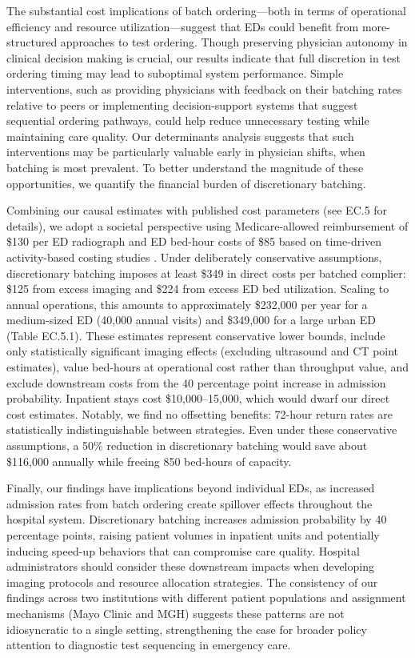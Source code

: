 \documentclass[,,blindrev]{informs}
\begin{document}
The substantial cost implications of batch ordering---both in terms of
operational efficiency and resource utilization---suggest that EDs could
benefit from more-structured approaches to test ordering. Though
preserving physician autonomy in clinical decision making is crucial,
our results indicate that full discretion in test ordering timing may
lead to suboptimal system performance. Simple interventions, such as
providing physicians with feedback on their batching rates relative to
peers or implementing decision-support systems that suggest sequential
ordering pathways, could help reduce unnecessary testing while
maintaining care quality. Our determinants analysis suggests that such
interventions may be particularly valuable early in physician shifts,
when batching is most prevalent. To better understand the magnitude of
these opportunities, we quantify the financial burden of discretionary
batching.

Combining our causal estimates with published cost parameters (see EC.5
for details), we adopt a societal perspective using Medicare-allowed
reimbursement of \$130 per ED radiograph \citep{dabus2025practice} and
ED bed-hour costs of \$85 based on time-driven activity-based costing
studies \citep[\citet{canellas2024measurement}]{schreyer2017economics}.
Under deliberately conservative assumptions, discretionary batching
imposes at least \$349 in direct costs per batched complier: \$125 from
excess imaging and \$224 from excess ED bed utilization. Scaling to
annual operations, this amounts to approximately \$232,000 per year for
a medium-sized ED (40,000 annual visits) and \$349,000 for a large urban
ED (Table EC.5.1). These estimates represent conservative lower bounds,
include only statistically significant imaging effects (excluding
ultrasound and CT point estimates), value bed-hours at operational cost
rather than throughput value, and exclude downstream costs from the 40
percentage point increase in admission probability. Inpatient stays cost
\$10,000--15,000, which would dwarf our direct cost estimates. Notably,
we find no offsetting benefits: 72-hour return rates are statistically
indistinguishable between strategies. Even under these conservative
assumptions, a 50\% reduction in discretionary batching would save about
\$116,000 annually while freeing 850 bed-hours of capacity.

Finally, our findings have implications beyond individual EDs, as
increased admission rates from batch ordering create spillover effects
throughout the hospital system. Discretionary batching increases
admission probability by 40 percentage points, raising patient volumes
in inpatient units and potentially inducing speed-up behaviors that can
compromise care quality. Hospital administrators should consider these
downstream impacts when developing imaging protocols and resource
allocation strategies. The consistency of our findings across two
institutions with different patient populations and assignment
mechanisms (Mayo Clinic and MGH) suggests these patterns are not
idiosyncratic to a single setting, strengthening the case for broader
policy attention to diagnostic test sequencing in emergency care.
\end{document}
